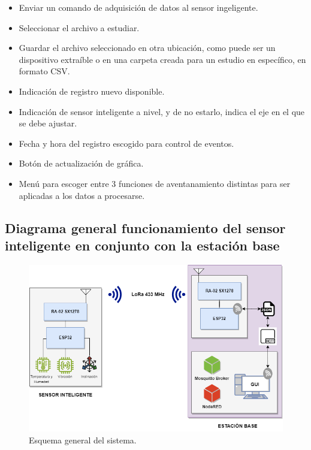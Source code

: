 \begin{itemize}
    \item Enviar un comando de adquisición de datos al sensor ingeligente.
    \item Seleccionar el archivo a estudiar.
    \item Guardar el archivo seleccionado en otra ubicación, como puede ser un dispositivo extraíble o en una carpeta creada para un estudio en específico, en formato CSV.
    \item Indicación de registro nuevo disponible.
    \item Indicación de sensor inteligente a nivel, y de no estarlo, indica el eje en el que se debe ajustar.
    \item Fecha y hora del registro escogido para control de eventos.
    \item Botón de actualización de gráfica.
    \item Menú para escoger entre 3 funciones de aventanamiento distintas para ser aplicadas a los datos a procesarse.
\end{itemize}


\subsection{Diagrama general funcionamiento del sensor inteligente en conjunto con la estación base}

\begin{figure}[H]
    \centering
    \includegraphics[width = \textwidth]{imagenes/cap2_marcometod/EsquemaGeneralSistema.png}
    \caption{Esquema general del sistema.}
    \label{fig:esquemageneral}
\end{figure}

